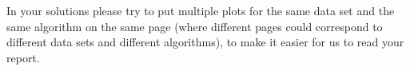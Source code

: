 \documentclass[11pt]{article}
\begin{document}
\begin{enumerate}
\begin{enumerate}

\end{enumerate}

\end{enumerate}

 In your solutions please try to put multiple plots for the same data set 
 and the same algorithm on the same page  
(where different pages could correspond to different data sets and different
algorithms), to make it easier for us to read your report.
\end{document}
